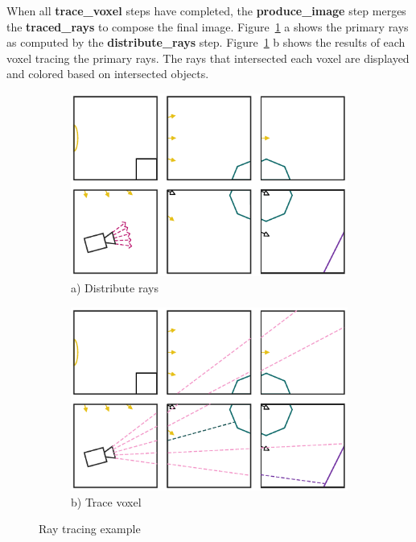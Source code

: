 When all \textbf{trace\_voxel} steps have completed, the \textbf{produce\_image}
step merges the \textbf{traced\_rays} to compose the final image.  
Figure~\ref{fig:trace} a shows the primary rays as computed by the 
\textbf{distribute\_rays} step.  Figure~\ref{fig:trace} b shows the results of 
each voxel tracing the primary rays.  The rays that intersected each voxel are 
displayed and colored based on intersected objects.

\begin{figure}[!hb]
\centering
\begin{subfigure}{.49\columnwidth}
 \centering
  \includegraphics[width=.98\columnwidth]{drawings/Trace1.pdf}
  a) Distribute rays
\end{subfigure}
\begin{subfigure}{.49\columnwidth}
 \centering
  \includegraphics[width=.98\columnwidth]{drawings/Trace2.pdf}
  b) Trace voxel
\end{subfigure}
\caption{Ray tracing example}
\label{fig:trace}
\end{figure}


